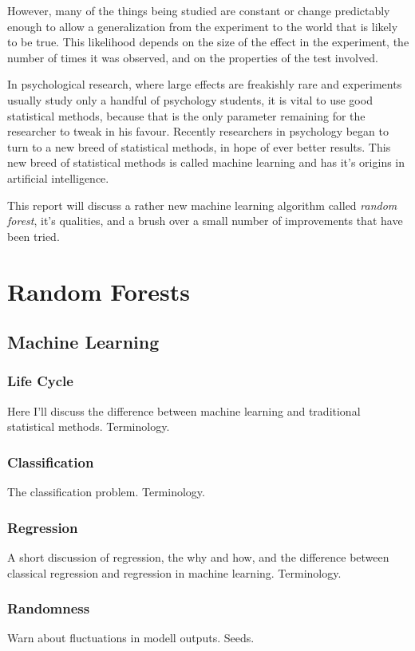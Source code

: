\documentclass[a4paper,man,12pt,apacite]{apa6} %
\begin{document}
However, many of the things being studied are constant or change
predictably enough to allow a generalization from the experiment to the world
that is likely to be true. This likelihood depends on the size of the
effect in the experiment, the number of times it was observed, and on
the properties of the test involved.

In psychological research, where large effects are freakishly rare and
experiments usually study only a handful of psychology students, it is
vital to use good statistical methods, because that is the only parameter
remaining for the researcher to tweak in his favour.
Recently researchers in psychology began to turn to a new breed of
statistical methods, in hope of ever better results. This new breed of
statistical methods is called machine learning and has it's origins in
artificial intelligence.

This report will discuss a rather new machine learning algorithm called
\emph{random forest}, it's qualities, and a brush over a small number of
improvements that have been tried.

\section{Random Forests}

\subsection{Machine Learning}

\subsubsection{Life Cycle}
Here I'll discuss the difference between machine learning and traditional
statistical methods. Terminology.

\subsubsection{Classification}
The classification problem. Terminology.

\subsubsection{Regression}
A short discussion of regression, the why and how, and the difference
between classical regression and regression in machine learning.
Terminology.

\subsubsection{Randomness}
Warn about fluctuations in modell outputs. Seeds.
\end{document}
